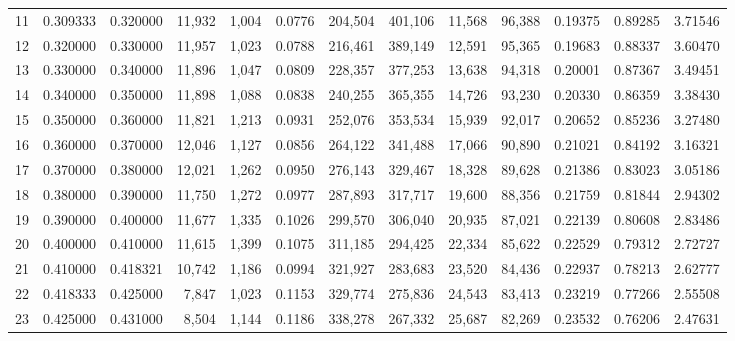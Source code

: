 \begin{tabular}{rrrrrrrrrrrrr}
11 &  0.309333 &  0.320000 &  11,932 &  1,004 &                                     0.0776 &  204,504 &  401,106 &   11,568 &   96,388 &  0.19375 &  0.89285 &  3.71546 \\
12 &  0.320000 &  0.330000 &  11,957 &  1,023 &                                     0.0788 &  216,461 &  389,149 &   12,591 &   95,365 &  0.19683 &  0.88337 &  3.60470 \\
13 &  0.330000 &  0.340000 &  11,896 &  1,047 &                                     0.0809 &  228,357 &  377,253 &   13,638 &   94,318 &  0.20001 &  0.87367 &  3.49451 \\
14 &  0.340000 &  0.350000 &  11,898 &  1,088 &                                     0.0838 &  240,255 &  365,355 &   14,726 &   93,230 &  0.20330 &  0.86359 &  3.38430 \\
15 &  0.350000 &  0.360000 &  11,821 &  1,213 &                                     0.0931 &  252,076 &  353,534 &   15,939 &   92,017 &  0.20652 &  0.85236 &  3.27480 \\
16 &  0.360000 &  0.370000 &  12,046 &  1,127 &                                     0.0856 &  264,122 &  341,488 &   17,066 &   90,890 &  0.21021 &  0.84192 &  3.16321 \\
17 &  0.370000 &  0.380000 &  12,021 &  1,262 &                                     0.0950 &  276,143 &  329,467 &   18,328 &   89,628 &  0.21386 &  0.83023 &  3.05186 \\
18 &  0.380000 &  0.390000 &  11,750 &  1,272 &                                     0.0977 &  287,893 &  317,717 &   19,600 &   88,356 &  0.21759 &  0.81844 &  2.94302 \\
19 &  0.390000 &  0.400000 &  11,677 &  1,335 &                                     0.1026 &  299,570 &  306,040 &   20,935 &   87,021 &  0.22139 &  0.80608 &  2.83486 \\
20 &  0.400000 &  0.410000 &  11,615 &  1,399 &                                     0.1075 &  311,185 &  294,425 &   22,334 &   85,622 &  0.22529 &  0.79312 &  2.72727 \\
21 &  0.410000 &  0.418321 &  10,742 &  1,186 &                                     0.0994 &  321,927 &  283,683 &   23,520 &   84,436 &  0.22937 &  0.78213 &  2.62777 \\
22 &  0.418333 &  0.425000 &   7,847 &  1,023 &                                     0.1153 &  329,774 &  275,836 &   24,543 &   83,413 &  0.23219 &  0.77266 &  2.55508 \\
23 &  0.425000 &  0.431000 &   8,504 &  1,144 &                                     0.1186 &  338,278 &  267,332 &   25,687 &   82,269 &  0.23532 &  0.76206 &  2.47631 \\

\end{tabular}
